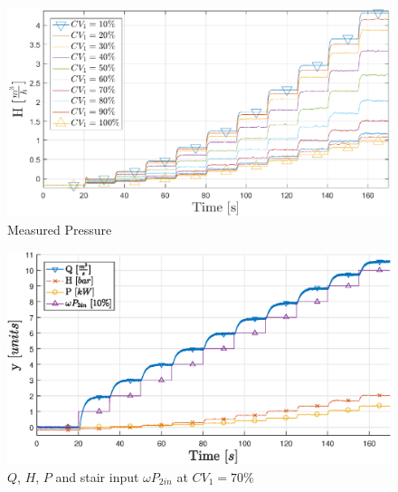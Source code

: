 \begin{figure}[H]
	\centering
	\includegraphics[height=\textwidth, width=\textheight, keepaspectratio, angle=270]{figures/05mathematicalModelling/measuredPressure.eps}
	\caption{Measured Pressure}
\end{figure}

\begin{figure}[H]
	\centering
	\includegraphics[height=\textwidth, width=\textheight, keepaspectratio, angle=270]{figures/04ExperimentsAndLabWork/testrun.eps}
	\caption{$Q$, $H$, $P$ and stair input $\omega P_{2in}$ at $CV_1 = 70\%$}
\end{figure}
